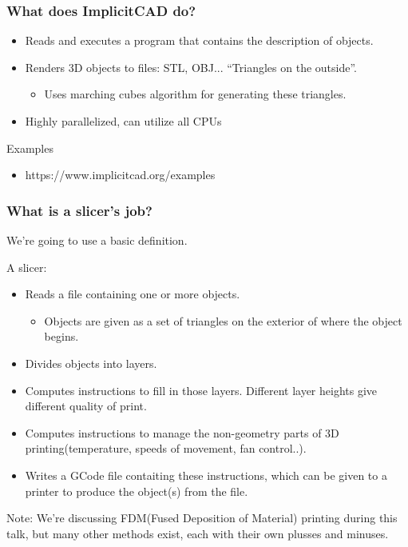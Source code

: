 \documentclass[hyperref={pdfpagemode=FullScreen},aspectratio=169]{beamer}
\begin{document}
\begin{frame}
  \frametitle{What does ImplicitCAD do?}
  \begin{itemize}
  \item Reads and executes a program that contains the description of objects.
  \item Renders 3D objects to files: STL, OBJ... ``Triangles on the outside''.
    \begin{itemize}
    \item Uses marching cubes algorithm for generating these triangles.
    \end{itemize}
  \item Highly parallelized, can utilize all CPUs
  \end{itemize}
  \begin{block}{Examples}
    \begin{itemize}
    \item https://www.implicitcad.org/examples
    \end{itemize}
  \end{block}
\end{frame}

\begin{frame}
  \frametitle{What is a slicer's job?}
  We're going to use a basic definition.\par
  \par
  A slicer:
  \begin{itemize}
  \item Reads a file containing one or more objects.
    \begin {itemize}
    \item Objects are given as a set of triangles on the exterior of where the object begins.
    \end{itemize}
  \item Divides objects into layers.
  \item Computes instructions to fill in those layers. Different layer heights give different quality of print.
  \item Computes instructions to manage the non-geometry parts of 3D printing(temperature, speeds of movement, fan control..).
  \item Writes a GCode file contaiting these instructions, which can be given to a printer to produce the object(s) from the file.
  \end{itemize}
  Note: We're discussing FDM(Fused Deposition of Material) printing during this talk, but many other methods exist, each with their own plusses and minuses.
\end{frame}
\end{document}
